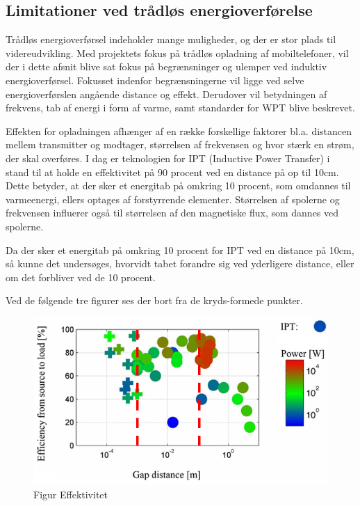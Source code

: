\subsection{Limitationer ved trådløs energioverførelse }
Trådløs energioverførsel indeholder mange muligheder, og der er stor plads til videreudvikling. Med projektets fokus på trådløs opladning af mobiltelefoner, vil der i dette afsnit blive sat fokus på begrænsninger og ulemper ved induktiv energioverførsel. Fokusset indenfor begrænsningerne vil ligge ved selve energioverførslen angående distance og effekt. Derudover vil betydningen af frekvens, tab af energi i form af varme, samt standarder for WPT blive beskrevet.

Effekten for opladningen afhænger af en række forskellige faktorer bl.a. distancen mellem transmitter og modtager, størrelsen af frekvensen og hvor stærk en strøm, der skal overføres. I dag er teknologien for IPT (Inductive Power Transfer) i stand til at holde en effektivitet på 90 procent ved en distance på op til 10cm. Dette betyder, at der sker et energitab på omkring 10 procent, som omdannes til varmeenergi, ellers optages af forstyrrende elementer. Størrelsen af spolerne og frekvensen influerer også til størrelsen af den magnetiske flux, som dannes ved spolerne.

Da der sker et energitab på omkring 10 procent for IPT ved en distance på 10cm, så kunne det undersøges, hvorvidt tabet forandre sig ved yderligere distance, eller om det forbliver ved de 10 procent.

Ved de følgende tre figurer ses der bort fra de kryds-formede punkter.

\begin{figure}[H]
\centering
\includegraphics[scale=0.5]{Vildledning/Schematics/Effektivitet_vs_gap.png}
\caption{Figur Effektivitet}
\end{figure}

